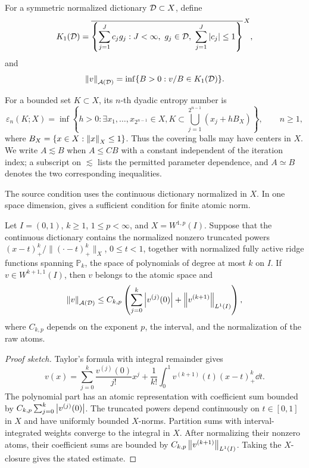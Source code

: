 \begin{definition}
\label{def:atomic}
For a symmetric normalized dictionary \(\mathcal{D}\subset X\), define
\[
 K_1(\D)=\overline{\left\{\sum_{j=1}^Jc_jg_j:
 J<\infty,\ g_j\in\D,\ \sum_{j=1}^J\abs{c_j}\leq1\right\}}^{\,X},
\]
and
\[
 \left\lVert v\right\rVert_{\mathcal A(\mathcal{D})}=
 \inf\{B>0:v/B\in K_1(\mathcal{D})\}.
\]
\end{definition}

For a bounded set \(K\subset X\), its \(n\)-th dyadic entropy number is
\[
 \varepsilon_n(K;X)=\inf\left\{h>0:\exists x_1,\ldots,x_{2^{n-1}}\in X,
 K\subset\bigcup_{j=1}^{2^{n-1}}(x_j+hB_X)\right\},\qquad n\geq1,
\]
where $B_X=\{x\in X:\left\lVert x\right\rVert_X\leq1\}$. Thus the covering balls may have centers in $X$.
We write
$A\lesssim B$ when $A\leq CB$ with a constant independent of the iteration index; a
subscript on $\lesssim$ lists the permitted parameter dependence, and $A\simeq B$ denotes the two
corresponding inequalities.


The source condition uses the continuous dictionary normalized in \(X\). In one space dimension,  gives a sufficient condition for finite atomic norm.

\begin{proposition}
\label{prop:1dsource}
Let \(I=(0,1)\), \(k\geq1\), \(1\leq p<\infty\), and \(X=W^{1,p}(I)\). Suppose that the continuous
dictionary contains the normalized nonzero truncated powers \((x-t)_+^k/\|(\cdot-t)_+^k\|_X\),
\(0\leq t<1\), together with normalized fully active ridge functions spanning
\(\mathbb P_k\), the space of polynomials of degree at most \(k\) on \(I\). If
\(v\in W^{k+1,1}(I)\), then \(v\) belongs to the atomic space and
\[
\left\lVert v\right\rVert_{\mathcal A(\mathcal{D})}\leq C_{k,p}\left(
 \sum_{j=0}^k\left|v^{(j)}(0)\right|+\left\lVert v^{(k+1)}\right\rVert_{L^1(I)}\right),
\]
where \(C_{k,p}\) depends on the exponent \(p\), the interval, and the normalization of the raw atoms.
\end{proposition}

\begin{proof}[Proof sketch]
Taylor's formula with integral remainder gives
\[
 v(x)=\sum_{j=0}^k\frac{v^{(j)}(0)}{j!}x^j
 +\frac1{k!}\int_0^1 v^{(k+1)}(t)(x-t)_+^k\dd t.
\]
The polynomial part has an atomic representation with coefficient sum bounded by
\(C_{k,p}\sum_{j=0}^k\left|v^{(j)}(0)\right|\).
The truncated powers depend continuously on \(t\in[0,1]\) in \(X\) and have uniformly bounded
\(X\)-norms. Partition sums with interval-integrated weights converge to the integral in
\(X\). After normalizing their nonzero atoms, their coefficient sums are bounded by
\(C_{k,p}\left\lVert v^{(k+1)}\right\rVert_{L^1(I)}\). Taking the \(X\)-closure gives the stated estimate.
\end{proof}

